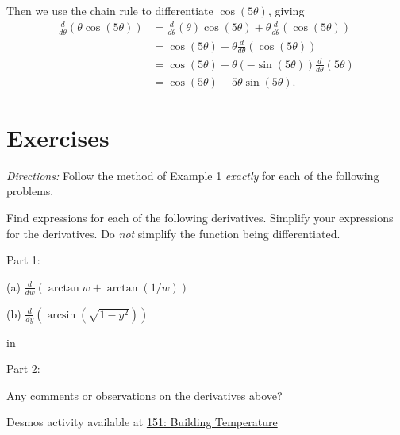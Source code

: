 \documentclass{ximera}
\newcommand{\pskip}{\vskip 0.1 in}
\begin{document}
\begin{example}
\begin{explanation}
Then we use the chain rule to differentiate $\cos(5\theta)$, giving
\begin{align*}
       \frac{d}{d\theta} \left( \theta \cos (5\theta) \right) &= \frac{d}{d\theta} \left(  \theta \right) \cos (5\theta) + \theta \frac{d}{d\theta} \left(  \cos (5\theta) \right)  \\ 
                          &= \cos(5\theta) + \theta  \frac{d}{d\theta} \left(  \cos (5\theta) \right)  \\
                         &= \cos(5\theta) + \theta (-\sin (5\theta)) \frac{d}{d\theta} \left( 5\theta  \right)  \\
                         &= \cos (5\theta) - 5 \theta \sin (5\theta) .
\end{align*}


\end{explanation}


\end{example}



\section*{Exercises}

\emph{Directions:} Follow the method of Example 1 \emph{exactly} for each of the following problems.


\begin{question}  \label{Q:MMMDNFD}
Find expressions for each of the following derivatives. Simplify your expressions for the derivatives. Do \emph{not} simplify the function being differentiated.

Part 1:

(a)  $\frac{d}{dw} \left( \arctan w + \arctan (1/w) \right)$ 

(b) $\frac{d}{dy} \left(  \arcsin\left(  \sqrt{1-y^2} \right) \right)$

\pskip

Part 2:

Any comments or observations on the derivatives above?


\end{question}


\begin{question}  \label{Q:Dfrg4ttgg}

\begin{onlineOnly}
    \begin{center}
\end{center}
\end{onlineOnly}

Desmos activity available at \href{https://www.desmos.com/calculator/zjqsdhvz4p}{151: Building Temperature}


\end{question}
\end{document}
